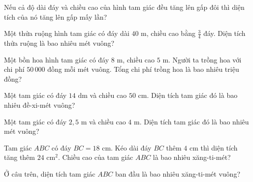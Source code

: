 \begin{ex}
  Nếu cả độ dài đáy và chiều cao của hình tam giác đều tăng lên gấp đôi thì diện tích của nó tăng lên gấp mấy lần?
\end{ex}

\begin{ex}
  Một thửa ruộng hình tam giác có đáy dài $40\text{ m}$, chiều cao bằng $\frac{3}{4}$ đáy. Diện tích thửa ruộng là bao nhiêu mét vuông?
\end{ex}

\begin{ex}
  Một bồn hoa hình tam giác có đáy $8\text{ m}$, chiều cao $5\text{ m}$. Người ta trồng hoa với chi phí $50\,000$ đồng mỗi mét vuông. Tổng chi phí trồng hoa là bao nhiêu triệu đồng?
\end{ex}

\begin{ex}
  Một tam giác có đáy $14\text{ dm}$ và chiều cao $50\text{ cm}$. Diện tích tam giác đó là bao nhiêu đề-xi-mét vuông?
\end{ex}

\begin{ex}
  Một tam giác có đáy $2{,}5\text{ m}$ và chiều cao $4\text{ m}$. Diện tích tam giác đó là bao nhiêu mét vuông?
\end{ex}

\begin{ex}
  Tam giác $ABC$ có đáy $BC = 18\text{ cm}$. Kéo dài đáy $BC$ thêm $4\text{ cm}$ thì diện tích tăng thêm $24\text{ cm}^2$. Chiều cao của tam giác $ABC$ là bao nhiêu xăng-ti-mét?
\end{ex}

\begin{ex}
  Ở câu trên, diện tích tam giác $ABC$ ban đầu là bao nhiêu xăng-ti-mét vuông?
\end{ex}

